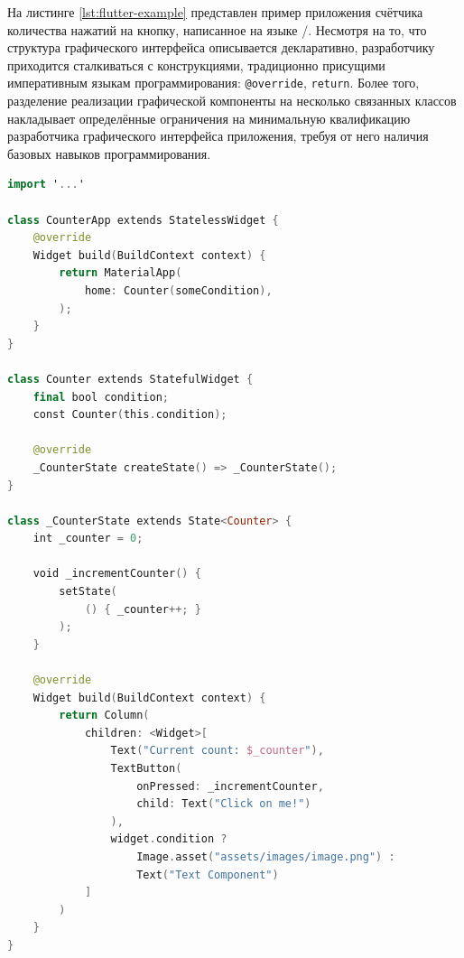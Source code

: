 На листинге \ref{lst:flutter-example} представлен пример приложения счётчика
количества нажатий на кнопку, написанное на языке /.
Несмотря на то, что структура графического интерфейса описывается
декларативно, разработчику приходится сталкиваться с конструкциями,
традиционно присущими императивным языкам программирования:
\texttt{@override}, \texttt{return}. Более того, разделение реализации
графической компоненты на несколько связанных классов накладывает
определённые ограничения на минимальную квалификацию разработчика
графического интерфейса приложения, требуя от него наличия базовых навыков
программирования.
\begin{lstlisting}[language=Swift,caption=Счётчик нажатия кнопки на языке
\name{Dart}/\name{Flutter},label={lst:flutter-example}]
import '...'

class CounterApp extends StatelessWidget {
    @override
    Widget build(BuildContext context) {
        return MaterialApp(
            home: Counter(someCondition),
        );
    }
}

class Counter extends StatefulWidget {
    final bool condition;
    const Counter(this.condition);
    
    @override
    _CounterState createState() => _CounterState();
}

class _CounterState extends State<Counter> {
    int _counter = 0;
    
    void _incrementCounter() {
        setState(
            () { _counter++; }
        );
    }
    
    @override
    Widget build(BuildContext context) {
        return Column(
            children: <Widget>[
                Text("Current count: $_counter"),
                TextButton(
                    onPressed: _incrementCounter,
                    child: Text("Click on me!")
                ),
                widget.condition ?
                    Image.asset("assets/images/image.png") :
                    Text("Text Component")
            ]
        )
    }
}
\end{lstlisting}

